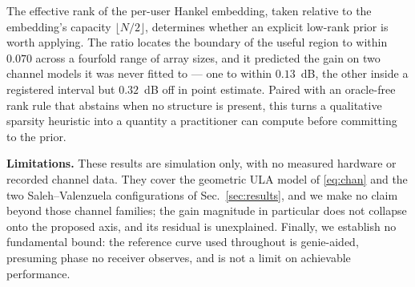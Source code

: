 \documentclass[journal]{IEEEtran}
\begin{document}
The effective rank of the per-user Hankel embedding, taken relative to the
embedding's capacity $\lfloor N/2\rfloor$, determines whether an explicit
low-rank prior is worth applying. The ratio locates the boundary of the useful
region to within $0.070$ across a fourfold range of array sizes, and it
predicted the gain on two channel models it was never fitted to --- one to
within $0.13$~dB, the other inside a registered interval but $0.32$~dB off in
point estimate. Paired with an oracle-free rank rule that abstains when no
structure is present, this turns a qualitative sparsity heuristic into a
quantity a practitioner can compute before committing to the prior.

\textbf{Limitations.} These results are simulation only, with no measured
hardware or recorded channel data. They cover the geometric ULA model of
\eqref{eq:chan} and the two Saleh--Valenzuela configurations of
Sec.~\ref{sec:results}, and we make no claim beyond those channel families;
the gain magnitude in particular does not collapse onto the proposed axis, and
its residual is unexplained. Finally, we establish no fundamental bound: the
reference curve used throughout is genie-aided, presuming phase no receiver
observes, and is not a limit on achievable performance.



\end{document}
